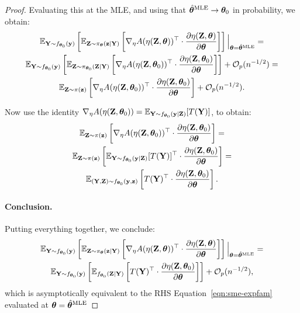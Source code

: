 \documentclass[twoside,11pt]{article}
\begin{document}
\begin{proof}
Evaluating this at the MLE, and using that \( \hat{{\bm{\theta}}}^{\text{MLE}} \to {\bm{\theta}}_0 \) in probability, we obtain:
\begin{multline}
\label{eqn:rhs-eval-at-mle}
\mathbb{E}_{{\bf Y} \sim f_{{\bm{\theta}}_0}({\bf y})} 
\left[
\mathbb{E}_{{\bf Z} \sim \pi_{\bm{\theta}}({\bf z} \mid {\bf Y})} 
\left[
\nabla_\eta A(\eta({\bf Z}, {\bm{\theta}}))^\top 
\cdot 
\frac{\partial \eta({\bf Z}, {\bm{\theta}})}{\partial {\bm{\theta}}}
\right]
\right] \Big|_{{\bm{\theta}} = \hat{{\bm{\theta}}}^{\text{MLE}}}
=\\
\mathbb{E}_{{\bf Y} \sim f_{{\bm{\theta}}_0}({\bf y})} 
\left[
\mathbb{E}_{{\bf Z} \sim \pi_{{\bm{\theta}}_0}({\bf Z} \mid {\bf Y})} 
\left[
\nabla_\eta A(\eta({\bf Z}, {\bm{\theta}}_0))^\top 
\cdot 
\frac{\partial \eta({\bf Z}, {\bm{\theta}}_0)}{\partial {\bm{\theta}}}
\right]
\right]
+ \mathcal{O}_p(n^{-1/2})
=\\
\mathbb{E}_{{\bf Z} \sim \pi({\bf z})} 
\left[
\nabla_\eta A(\eta({\bf Z}, {\bm{\theta}}_0))^\top 
\cdot 
\frac{\partial \eta({\bf Z}, {\bm{\theta}}_0)}{\partial {\bm{\theta}}}
\right]
+ \mathcal{O}_p(n^{-1/2}).
\end{multline}

Now use the identity \( \nabla_\eta A(\eta({\bf Z}, {\bm{\theta}}_0)) = \mathbb{E}_{{\bf Y} \sim f_{{\bm{\theta}}_0}({\bf y} \mid {\bf Z})}[T({\bf Y})] \), to obtain:
\begin{multline}
\mathbb{E}_{{\bf Z} \sim \pi({\bf z})} 
\left[
\nabla_\eta A(\eta({\bf Z}, {\bm{\theta}}_0))^\top 
\cdot 
\frac{\partial \eta({\bf Z}, {\bm{\theta}}_0)}{\partial {\bm{\theta}}}
\right]
=\\
\mathbb{E}_{{\bf Z} \sim \pi({\bf z})} 
\left[
\mathbb{E}_{{\bf Y} \sim f_{{\bm{\theta}}_0}({\bf y} \mid {\bf Z})}[T({\bf Y})]^\top 
\cdot 
\frac{\partial \eta({\bf Z}, {\bm{\theta}}_0)}{\partial {\bm{\theta}}}
\right]
=\\
\mathbb{E}_{({\bf Y}, {\bf Z}) \sim f_{{\bm{\theta}}_0}({\bf y}, {\bf z})} 
\left[
T({\bf Y})^\top 
\cdot 
\frac{\partial \eta({\bf Z}, {\bm{\theta}}_0)}{\partial {\bm{\theta}}}
\right].
\end{multline}

\paragraph{Conclusion.} Putting everything together, we conclude:
\begin{multline}
\mathbb{E}_{{\bf Y} \sim f_{{\bm{\theta}}_0}({\bf y})} 
\left[
\mathbb{E}_{{\bf Z}\sim \pi_{\bm{\theta}}({\bf z} \mid {\bf Y})} 
\left[
\nabla_\eta A(\eta({\bf Z}, {\bm{\theta}}))^\top 
\cdot 
\frac{\partial \eta({\bf Z}, {\bm{\theta}})}{\partial {\bm{\theta}}}
\right]
\right] \Big|_{{\bm{\theta}} = \hat{{\bm{\theta}}}^{\text{MLE}}}
=\\
\mathbb{E}_{{\bf Y} \sim f_{{\bm{\theta}}_0}({\bf y})} 
\left[
\mathbb{E}_{f_{{\bm{\theta}}_0}({\bf Z} \mid {\bf Y})} 
\left[
T({\bf Y})^\top 
\cdot 
\frac{\partial \eta({\bf Z}, {\bm{\theta}}_0)}{\partial {\bm{\theta}}}
\right]
\right]
+ \mathcal{O}_p(n^{-1/2}),
\end{multline}
which is asymptotically equivalent to the RHS Equation~\eqref{eqn:sme-expfam} evaluated at ${\bm{\theta}} = \hat{{\bm{\theta}}}^{\text{MLE}}$



\end{proof}
\end{document}
